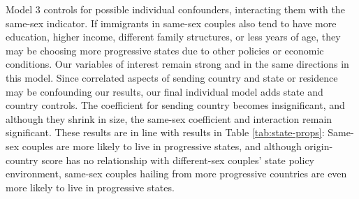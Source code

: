 \documentclass[
  11pt,
]{article}
\begin{document}
Model 3 controls for possible individual confounders, interacting them with the same-sex indicator. If immigrants in same-sex couples also tend to have more education, higher income, different family structures, or less years of age, they may be choosing more progressive states due to other policies or economic conditions. Our variables of interest remain strong and in the same directions in this model. Since correlated aspects of sending country and state or residence may be confounding our results, our final individual model adds state and country controls. The coefficient for sending country becomes insignificant, and although they shrink in size, the same-sex coefficient and interaction remain significant. These results are in line with results in Table \ref{tab:state-props}: Same-sex couples are more likely to live in progressive states, and although origin-country score has no relationship with different-sex couples' state policy environment, same-sex couples hailing from more progressive countries are even more likely to live in progressive states.
\end{document}
